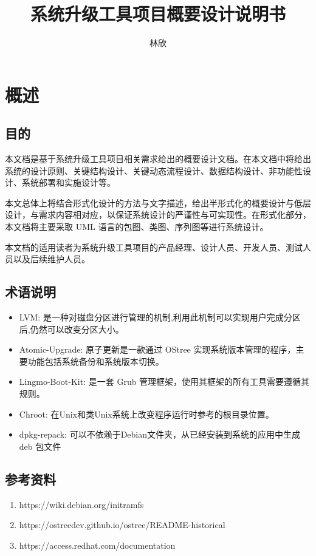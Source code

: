 \documentclass{utart}
\title{系统升级工具项目概要设计说明书}
\author{林欣}
\begin{document}


\graphicspath{ {./images/} }

\utMakeTOC

\newpage

\section{概述}
\subsection{目的}
本文档是基于系统升级工具项目相关需求给出的概要设计文档。在本文档中将给出系统的设计原则、关键结构设计、关键动态流程设计、数据结构设计、非功能性设计、系统部署和实施设计等。

本文总体上将结合形式化设计的方法与文字描述，给出半形式化的概要设计与低层设计，与需求内容相对应，以保证系统设计的严谨性与可实现性。在形式化部分，本文档将主要采取 UML 语言的包图、类图、序列图等进行系统设计。

本文档的适用读者为系统升级工具项目的产品经理、设计人员、开发人员、测试人员以及后续维护人员。

\subsection{术语说明}
\begin{itemize}
    \item LVM: 是一种对磁盘分区进行管理的机制,利用此机制可以实现用户完成分区后,仍然可以改变分区大小。
    \item Atomic-Upgrade: 原子更新是一款通过 OStree 实现系统版本管理的程序，主要功能包括系统备份和系统版本切换。
    \item Lingmo-Boot-Kit: 是一套 Grub 管理框架，使用其框架的所有工具需要遵循其规则。
    \item Chroot: 在Unix和类Unix系统上改变程序运行时参考的根目录位置。
    \item dpkg-repack: 可以不依赖于Debian文件夹，从已经安装到系统的应用中生成 deb 包文件
\end{itemize}

\subsection{参考资料}
\begin{enumerate}
    \item https://wiki.debian.org/initramfs
    \item https://ostreedev.github.io/ostree/README-historical
    \item https://access.redhat.com/documentation
\end{enumerate}
\end{document}
